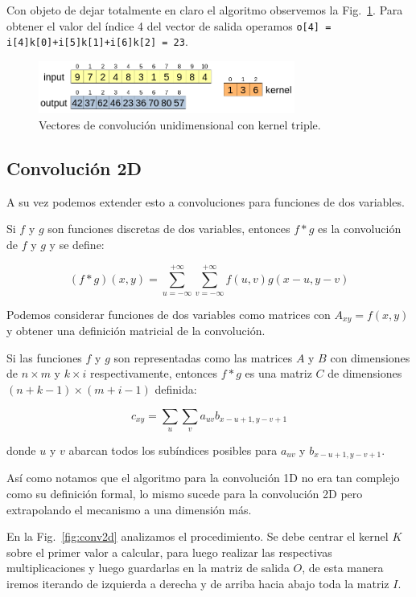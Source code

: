 \documentclass[a4paper,12pt]{article}
\begin{document}
Con objeto de dejar totalmente en claro el algoritmo observemos la Fig.~\ref{fig:conv1dk3}. Para obtener el valor del índice 4 del vector de salida operamos \texttt{o[4] = i[4]k[0]+i[5]k[1]+i[6]k[2] = 23}.

\begin{figure}[H]
	\begin{center}				
		\includegraphics[width=0.75\textwidth]{tesis_26.png}
		\caption{Vectores de convolución unidimensional con kernel triple.}
		\label{fig:conv1dk3}
	\end{center}
\end{figure}

\subsection{Convolución 2D}

A su vez podemos extender esto a convoluciones para funciones de dos variables.

Si $f$ y $g$ son funciones discretas de dos variables, entonces $f*g$ es la convolución de $f$ y $g$ y se define:

$$
(f*g)(x,y) = \sum_{u=-\infty}^{+\infty} \sum_{v=-\infty}^{+\infty} f(u,v)g(x-u,y-v)
$$

Podemos considerar funciones de dos variables como matrices con $A_{xy} = f(x,y)$ y obtener una definición matricial de la convolución.

Si las funciones $f$ y $g$ son representadas como las matrices $A$ y $B$ con dimensiones de $n \times m$ y $k \times i$ respectivamente, entonces $f*g$ es una matriz $C$ de dimensiones $(n+k-1) \times (m+i-1)$ definida:

$$
c_{xy} = \sum_{u} \sum_{v} a_{uv} b_{x-u+1,y-v+1}
$$

donde $u$ y $v$ abarcan todos los subíndices posibles para $a_{uv}$ y $b_{x-u+1,y-v+1}$.

Así como notamos que el algoritmo para la convolución 1D no era tan complejo como su definición formal, lo mismo sucede para la convolución 2D pero extrapolando el mecanismo a una dimensión más.

En la Fig.~\ref{fig:conv2d} \citep{andrianaivo2019architecture} analizamos el procedimiento. Se debe centrar el kernel $K$ sobre el primer valor a calcular, para luego realizar las respectivas multiplicaciones y luego guardarlas en la matriz de salida $O$, de esta manera iremos iterando de izquierda a derecha y de arriba hacia abajo toda la matriz $I$.
\end{document}
